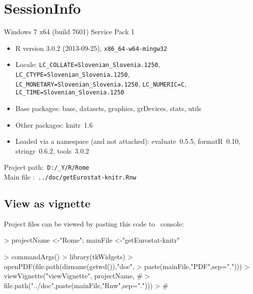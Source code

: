 \documentclass[a4paper,12pt]{article}\usepackage[]{graphicx}\usepackage[]{color}
\begin{document}
%
%

%

\clearpage
\section*{SessionInfo}
{\small
Windows 7 x64 (build 7601) Service Pack 1 
\begin{itemize}\raggedright
  \item R version 3.0.2 (2013-09-25), \verb|x86_64-w64-mingw32|
  \item Locale: \verb|LC_COLLATE=Slovenian_Slovenia.1250|, \verb|LC_CTYPE=Slovenian_Slovenia.1250|, \verb|LC_MONETARY=Slovenian_Slovenia.1250|, \verb|LC_NUMERIC=C|, \verb|LC_TIME=Slovenian_Slovenia.1250|
  \item Base packages: base, datasets, graphics, grDevices,
    stats, utils
  \item Other packages: knitr~1.6
  \item Loaded via a namespace (and not attached):
    evaluate~0.5.5, formatR~0.10, stringr~0.6.2, tools~3.0.2
\end{itemize}
Project path:\verb' D:/_Y/R/Rome '\\
Main file :\verb' ../doc/getEurostat-knitr.Rnw '


\subsection*{View as vignette}
Project files can be viewed by pasting this code to \R\ console:\\
\begin{Schunk}
\begin{Sinput}
> projectName <-"Rome";  mainFile <-"getEurostat-knitr"

\end{Sinput}
\end{Schunk}
\begin{Schunk}
\begin{Sinput}
> commandArgs()
> library(tkWidgets)
> openPDF(file.path(dirname(getwd()),"doc",
> paste(mainFile,"PDF",sep=".")))
> viewVignette("viewVignette", projectName, #
> file.path("../doc",paste(mainFile,"Rnw",sep=".")))
> #
\end{Sinput}
\end{Schunk}

}
\end{document}

